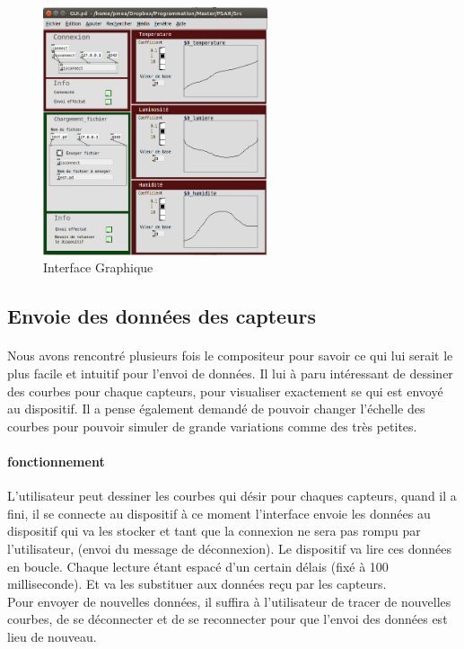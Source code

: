 \documentclass[a4paper, titlepage, oneside, 12pt]{article}%
\begin{document}
\begin{figure}[H]
	\centering
	\includegraphics[width=250px] {GUI.jpg}
	\caption{Interface Graphique}
\end{figure}
\subsection{Envoie des données des capteurs}
\paragraph{}
Nous avons rencontré plusieurs fois le compositeur pour savoir ce qui lui serait le plus facile et intuitif pour l'envoi de données. Il lui à paru intéressant de dessiner des courbes pour chaque capteurs, pour visualiser exactement se qui est envoyé au dispositif. Il a pense également demandé de pouvoir changer l'échelle des courbes pour pouvoir simuler de grande variations comme des très petites.\\

\paragraph{fonctionnement}
L'utilisateur peut dessiner les courbes qui désir pour chaques capteurs, quand il a fini, il se connecte au dispositif à ce moment l'interface envoie les données au dispositif qui va les stocker et tant que la connexion ne sera pas rompu par l'utilisateur, (envoi du message de déconnexion). Le dispositif va lire ces données en boucle. Chaque lecture étant espacé d'un certain délais (fixé à 100 milliseconde). Et va les substituer aux données reçu par les capteurs.\\
Pour envoyer de nouvelles données, il suffira à l'utilisateur de tracer de nouvelles courbes, de se déconnecter et de se reconnecter pour que l'envoi des données est lieu de nouveau.
\end{document}
